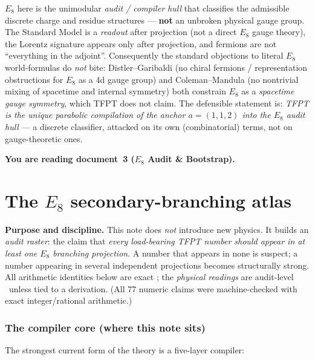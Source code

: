 \begin{gapbox}
$E_8$ here is the unimodular \emph{audit / compiler hull} that classifies the admissible discrete charge
and residue structures --- \textbf{not} an unbroken physical gauge group. The Standard Model is a
\emph{readout} after projection (not a direct $E_8$ gauge theory), the Lorentz signature appears only
after projection, and fermions are not ``everything in the adjoint''. Consequently the standard
objections to literal $E_8$ world-formulas do \emph{not} bite: Distler--Garibaldi (no chiral fermions /
representation obstructions for $E_8$ as a 4d gauge group) and Coleman--Mandula (no nontrivial mixing of
spacetime and internal symmetry) both constrain $E_8$ as a \emph{spacetime gauge symmetry}, which TFPT
does not claim. The defensible statement is: \emph{TFPT is the unique parabolic compilation of the anchor
$a=(1,1,2)$ into the $E_8$ audit hull} --- a discrete classifier, attacked on its own (combinatorial)
terms, not on gauge-theoretic ones.
\end{gapbox}


\noindent\textbf{You are reading \textbf{document~3} ($E_8$ Audit \& Bootstrap).}


\TFPTbadges
\TFPTclaimstack[compiler]


\tableofcontents
\clearpage
\part{The $E_8$ secondary-branching atlas}
\par\smallskip\noindent\textbf{Purpose and discipline.}
This note does \emph{not} introduce new physics. It builds an \emph{audit raster}: the claim that
\emph{every load-bearing TFPT number should appear in at least one $E_8$ branching projection}. A number
that appears in none is suspect; a number appearing in several independent projections becomes
structurally strong. All arithmetic identities below are exact \mE; the \emph{physical readings} are
audit-level \mO\ unless tied to a derivation. (All 77 numeric claims were machine-checked with exact
integer/rational arithmetic.)

\section{The compiler core (where this note sits)}
The strongest current form of the theory is a five-layer compiler:

